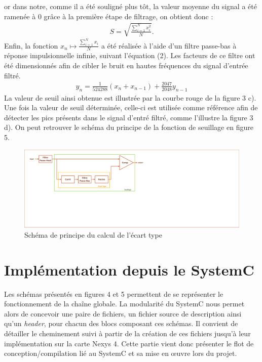 \documentclass[a4paper,12pt]{article}
\begin{document}
\begin{itemize}
\begin{itemize}
or dans notre, comme il a été souligné plus tôt, la valeur moyenne du signal a été ramenée à 0 grâce à la première étape de filtrage, on obtient donc :
\begin{eqnarray*}
S = \sqrt{\frac{\sum^N_{i=1}x_i^2}{N}}.
\end{eqnarray*}
Enfin, la fonction $x_n\mapsto\frac{\sum^N_{i=1}x_i}{N}$ a été réalisée à l'aide d'un filtre passe-bas à réponse impulsionnelle infinie, suivant l'équation (2). Les facteurs de ce filtre ont été dimensionnés afin de cibler le bruit en hautes fréquences du signal d'entrée filtré.
\begin{eqnarray}
y_n = \frac{1}{524288}\left(x_n + x_{n-1}\right) + \frac{2047}{2048}y_{n-1}
\end{eqnarray}
La valeur de seuil ainsi obtenue est illustrée par la courbe rouge de la figure 3 c). Une fois la valeur de seuil déterminée, celle-ci est utilisée comme référence afin de détecter les pics présents dans le signal d'entré filtré, comme
 l'illustre la figure 3 d). On peut retrouver le schéma du principe de la fonction de seuillage en figure 5.
\begin{figure}[H]
\centering
\includegraphics[width=\textwidth, keepaspectratio]{chainXavier.pdf}
\caption{Schéma de principe du calcul de l'écart type}
\end{figure}
\end{itemize}
\end{itemize}
\newpage
\section{Implémentation depuis le SystemC}
Les schémas présentés en figures 4 et 5 permettent de se représenter le fonctionnement de la chaîne globale. La modularité du SystemC nous permet alors de concevoir une paire de fichiers, un fichier source de description ainsi qu'un \textit{header}, pour chacun des blocs composant ces schémas. Il convient de détailler le cheminement suivi à partir de la création de ces fichiers jusqu'à leur implémentation sur la carte Nexys 4. Cette partie vient donc présenter le flot de conception/compilation lié au SystemC et sa mise en œuvre lors du projet.
\end{document}
